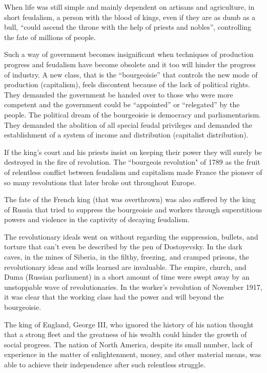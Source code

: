 When life was still simple and mainly dependent on artisans and agriculture, in short feudalism, a 
person with the blood of kings, even if they are as dumb as a bull, “could ascend the throne with the help of priests and nobles”, 
controlling the fate of millions of people.\vskip 0.2in

Such a way of government becomes insignificant when techniques of production progress and feudalism 
have become obsolete and it too will hinder the progress of industry. A new class, that is the “bourgeoisie” 
that controls the new mode of production (capitalism), feels discontent because of the lack of political rights. 
They demanded the government be handed over to those who were more competent and the government could be “appointed” or 
“relegated” by the people. The political dream of the bourgeoisie is democracy and parliamentarism. They demanded the abolition 
of all special feudal privileges and demanded the establishment of a system of income and distribution (capitalist distribution).\vskip 0.2in

If the king's court and his priests insist on keeping their power they will surely be destroyed in the 
fire of revolution. The “bourgeois revolution" of 1789 as the fruit of relentless conflict between feudalism 
and capitalism made France the pioneer of so many revolutions that later broke out throughout Europe.\vskip 0.2in

The fate of the French king (that was overthrown) was also suffered by the king of Russia that tried to 
suppress the bourgeoisie and workers through superstitious powers and violence in the captivity of decaying feudalism.\vskip 0.2in

The revolutionary ideals went on without regarding the suppression, bullets, and torture that can't even be described 
by the pen of Dostoyevsky. In the dark caves, in the mines of Siberia, in the filthy, freezing, and cramped prisons, 
the revolutionary ideas and wills learned are invaluable. The empire, church, and Duma (Russian parliament) in a short 
amount of time were swept away by an unstoppable wave of revolutionaries. In the worker's revolution of November 1917, 
it was clear that the working class had the power and will beyond the bourgeoisie.\vskip 0.2in

The king of England, George III, who ignored the history of his nation thought that a strong fleet 
and the greatness of his wealth could hinder the growth of social progress. The nation of North America, 
despite its small number, lack of experience in the matter of enlightenment, money, and other material means, 
was able to achieve their independence after such relentless struggle.\vskip 0.2in

